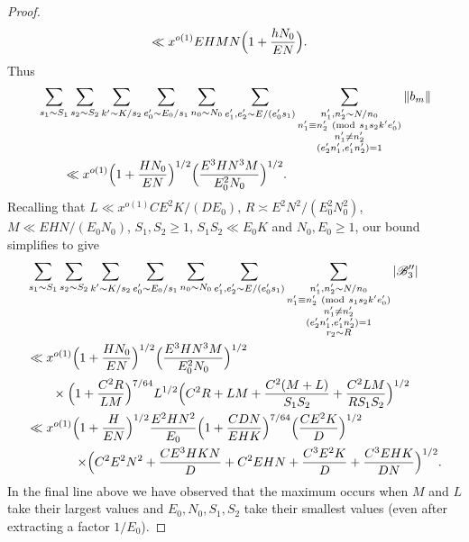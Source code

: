 \documentclass[10pt]{amsart}
\theoremstyle{plain}
\numberwithin{equation}{section}
\newcommand{\Mod}[1]{\ (\mathrm{mod}\ #1)}
\begin{document}
\begin{proof}
\begin{align*}
&\ll x^{o(1)} E H M N\Bigl(1+\frac{h N_0}{E N}\Bigr).
\end{align*}
Thus
\begin{align*}
&\sum_{s_1\sim S_1}\sum_{s_2\sim S_2}\sum_{k'\sim K/s_2}\sum_{e_0'\sim E_0/s_1}\sum_{n_0\sim N_0}\sum_{\substack{e_1',e_2'\sim E/(e_0's_1)}}\sum_{\substack{n_1',n_2'\sim N/n_0\\ n_1'\equiv n_2'\Mod{s_1s_2 k' e_0'}\\ n_1'\ne n_2'\\ (e_2'n_1',e_1'n_2')=1}}\|b_{m}\|\\
&\qquad\ll x^{o(1)} \Bigl(1+ \frac{H N_0}{E N}\Bigr)^{1/2}\Bigl(\frac{E^3 H N^3 M}{E_0^2 N_0}\Bigr)^{1/2}.
\end{align*}
Recalling that $L\ll x^{o(1)}C E^2 K/(D E_0)$, $R\asymp  E^2 N^2/(E_0^2 N_0^2)$, $M\ll E H N/(E_0 N_0)$, $S_1,S_2\ge 1$, $S_1S_2\ll E_0 K$ and $N_0,E_0\ge 1$, our bound simplifies to give
\begin{align*}
&\sum_{s_1\sim S_1}\sum_{s_2\sim S_2}\sum_{\substack{k'\sim K/s_2}}\sum_{\substack{e_0'\sim E_0/s_1}}\sum_{n_0\sim N_0}\sum_{\substack{e_1',e_2'\sim E/(e_0's_1)}}\sum_{\substack{n_1',n_2'\sim N/n_0\\ n_1'\equiv n_2'\Mod{s_1s_2k'e_0'}\\ n_1'\ne n_2' \\ (e_2'n_1',e_1'n_2')=1\\ r_2\sim R}}|\mathscr{B}_3''|\\
&\ll  x^{o(1)} \Bigl(1+ \frac{H N_0}{E N}\Bigr)^{1/2}\Bigl(\frac{E^3 H N^3 M}{E_0^2 N_0}\Bigr)^{1/2}\\
&\qquad \times  \Bigl(1+\frac{C^2 R}{L M}\Bigr)^{7/64}L^{1/2}\Bigl(C^2 R+L M+\frac{C^2(M+L)}{S_1 S_2}+\frac{C^2 L M}{R S_1 S_2}\Bigr)^{1/2}\\
&\ll x^{o(1)}\Bigl(1+\frac{H}{EN}\Bigr)^{1/2}\frac{E^2 H N^2}{E_0}\Bigl(1+\frac{C D N}{E H K}\Bigr)^{7/64}\Bigl(\frac{C E^2 K}{D}\Bigr)^{1/2} \\%
&\qquad\qquad \times\Bigr( C^2 E^2 N^2+ \frac{C E^3 H K N}{D}+C^2 E H N+\frac{C^3 E^2 K}{D}+\frac{C^3 E H K}{D N}\Bigr)^{1/2}.
\end{align*}
In the final line above we have observed that the maximum occurs when $M$ and $L$ take their largest values and $E_0,N_0,S_1,S_2$ take their smallest values (even after extracting a factor $1/E_0$).


\end{proof}
\end{document}
